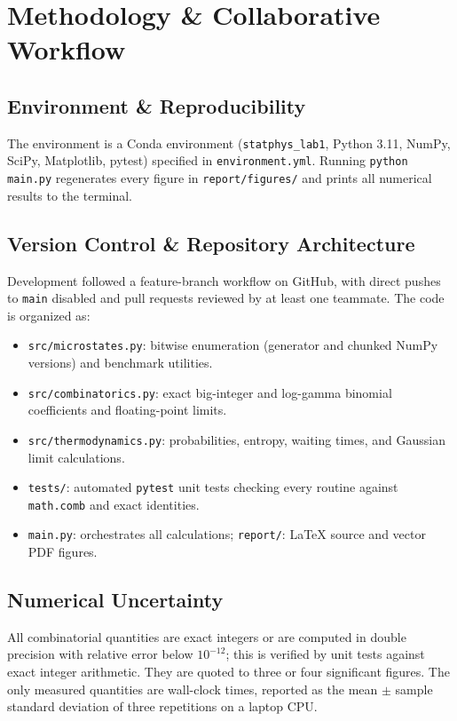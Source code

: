 \documentclass[11pt, a4paper]{article}
\begin{document}
\section{Methodology \& Collaborative Workflow}

\subsection{Environment \& Reproducibility}
The environment is a Conda environment (\texttt{statphys\_lab1}, Python 3.11, NumPy, SciPy, Matplotlib, pytest) specified in \texttt{environment.yml}. Running \texttt{python main.py} regenerates every figure in \texttt{report/figures/} and prints all numerical results to the terminal.

\subsection{Version Control \& Repository Architecture}
Development followed a feature-branch workflow on GitHub, with direct pushes to \texttt{main} disabled and pull requests reviewed by at least one teammate. The code is organized as:
\begin{itemize}
    \item \texttt{src/microstates.py}: bitwise enumeration (generator and chunked NumPy versions) and benchmark utilities.
    \item \texttt{src/combinatorics.py}: exact big-integer and log-gamma binomial coefficients and floating-point limits.
    \item \texttt{src/thermodynamics.py}: probabilities, entropy, waiting times, and Gaussian limit calculations.
    \item \texttt{tests/}: automated \texttt{pytest} unit tests checking every routine against \texttt{math.comb} and exact identities.
    \item \texttt{main.py}: orchestrates all calculations; \texttt{report/}: \LaTeX{} source and vector PDF figures.
\end{itemize}

\subsection{Numerical Uncertainty}
All combinatorial quantities are exact integers or are computed in double precision with relative error below $10^{-12}$; this is verified by unit tests against exact integer arithmetic. They are quoted to three or four significant figures. The only measured quantities are wall-clock times, reported as the mean $\pm$ sample standard deviation of three repetitions on a laptop CPU.
\end{document}
